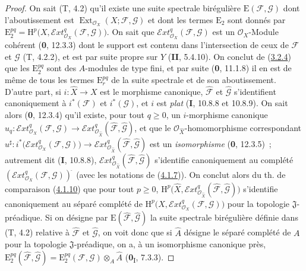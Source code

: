 \begin{proof}
On sait (T, 4.2) qu'il existe une suite spectrale birégulière
$\mathrm E(\mathcal F,\mathcal G)$ dont l'aboutissement est
$\operatorname{Ext}_{\mathcal O_X}(X;\mathcal F,\mathcal G)$ et dont les termes
$\mathrm E_2$ sont donnés par
$\mathrm E_2^{pq}=\mathrm H^p\bigl(X,
\mathcal{E}\!xt^q_{\mathcal O_X}(\mathcal F,\mathcal G)\bigr)$.
On sait que $\mathcal{E}\!xt^q_{\mathcal O_X}(\mathcal F,\mathcal G)$ est un
$\mathcal O_X$-Module cohérent (\textbf{0}, 12.3.3) dont le support est contenu dans
l'intersection de ceux de $\mathcal F$ et $\mathcal G$ (T, 4.2.2), et est
par suite propre sur $Y$ (\textbf{II}, 5.4.10). On conclut de
(\hyperref[III.3.2.4-fr]{3.2.4}) que les $\mathrm E_2^{pq}$ sont des
$A$-modules de type fini, et par suite (\textbf{0}, 11.1.8) il en est de même de tous
les termes $\mathrm E_r^{pq}$ de la suite spectrale et de son aboutissement.
D'autre part, si $i:\widehat X\to X$ est le morphisme canonique,
$\widehat{\mathcal F}$ et $\widehat{\mathcal G}$ s'identifient canoniquement
à $i^*(\mathcal F)$ et $i^*(\mathcal G)$, et $i$ est \emph{plat} (\textbf{I}, 10.8.8 et
10.8.9). On sait alors (\textbf{0}, 12.3.4) qu'il existe, pour tout $q\geq0$, un
$i$-morphisme canonique
$u_q:\mathcal{E}\!xt^q_{\mathcal O_X}(\mathcal F,\mathcal G)
\longrightarrow
\mathcal{E}\!xt^q_{\mathcal O_{\widehat X}}
(\widehat{\mathcal F},\widehat{\mathcal G})$,
et que le $\mathcal O_{\widehat X}$-homomorphisme correspondant
$u^\sharp:i^*\bigl(\mathcal{E}\!xt^q_{\mathcal O_X}(\mathcal F,\mathcal G)\bigr)
\longrightarrow
\mathcal{E}\!xt^q_{\mathcal O_{\widehat X}}
(\widehat{\mathcal F},\widehat{\mathcal G})$
est un \emph{isomorphisme} (\textbf{0}, 12.3.5)~; autrement dit (\textbf{I}, 10.8.8),
$\mathcal{E}\!xt^q_{\mathcal O_{\widehat X}}
(\widehat{\mathcal F},\widehat{\mathcal G})$ s'identifie canoniquement au
complété $(\mathcal{E}\!xt^q_{\mathcal O_X}(\mathcal F,\mathcal G))^{\widehat{\,}}$ (avec les
notations de (\hyperref[III.4.1.7-fr]{4.1.7})). On conclut alors du th. de
comparaison (\hyperref[III.4.1.10-fr]{4.1.10}) que pour tout $p\geq0$,
$\mathrm H^p\bigl(\widehat X,
\mathcal{E}\!xt^q_{\mathcal O_{\widehat X}}
(\widehat{\mathcal F},\widehat{\mathcal G})\bigr)$
s'identifie canoniquement au séparé complété
de
$\mathrm H^p\bigl(X,\mathcal{E}\!xt^q_{\mathcal O_X}
(\mathcal F,\mathcal G)\bigr)$ pour la topologie $\mathfrak J$-préadique.
Si on désigne par $\mathrm E(\widehat{\mathcal F},
\widehat{\mathcal G})$ la suite spectrale birégulière définie dans (T, 4.2)
relative à $\widehat{\mathcal F}$ et $\widehat{\mathcal G}$, on voit donc que
si $\widehat A$ désigne le séparé complété de $A$ pour la topologie
$\mathfrak J$-préadique, on a, à un isomorphisme canonique près,
$\mathrm E_2^{pq}(\widehat{\mathcal F},\widehat{\mathcal G})
=\mathrm E_2^{pq}(\mathcal F,\mathcal G)\otimes_A\widehat A$
(\textbf{0}\textsubscript{I}, 7.3.3).


\end{proof}
